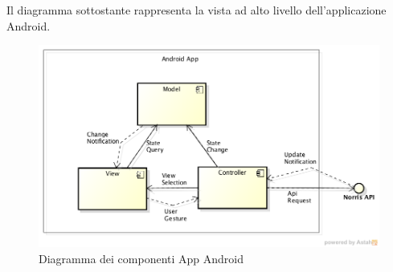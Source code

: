     Il diagramma sottostante rappresenta la vista ad alto livello dell'applicazione Android.
   
    \begin{figure}[H]\centering
        \includegraphics[width=\textwidth]{SpecificaTecnica/Pics/AndroidAppComponentDiagramLevel0.png}
        \caption{Diagramma dei componenti App Android}
    \end{figure}

